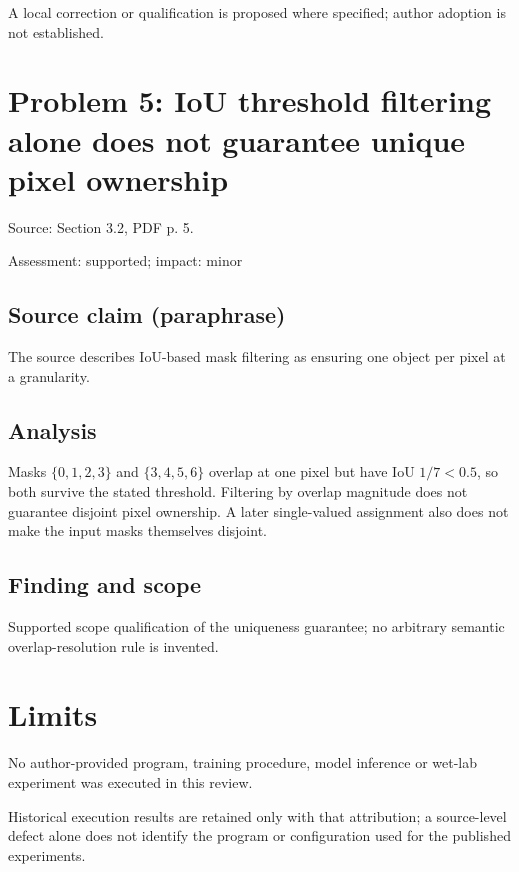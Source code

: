 \documentclass[11pt]{article}
\begin{document}
A local correction or qualification is proposed where specified; author adoption is not established.

\section*{Problem 5: IoU threshold filtering alone does not guarantee unique pixel ownership}

Source: Section 3.2, PDF p. 5.

Assessment: supported; impact: minor

\subsection*{Source claim (paraphrase)}

The source describes IoU-based mask filtering as ensuring one object per pixel at a granularity.

\subsection*{Analysis}

Masks \(\{0,1,2,3\}\) and \(\{3,4,5,6\}\) overlap at one pixel but have IoU \(1/7<0.5\), so both survive the stated threshold. Filtering by overlap magnitude does not guarantee disjoint pixel ownership. A later single-valued assignment also does not make the input masks themselves disjoint.

\subsection*{Finding and scope}

Supported scope qualification of the uniqueness guarantee; no arbitrary semantic overlap-resolution rule is invented.

\section*{Limits}

No author-provided program, training procedure, model inference or wet-lab experiment was executed in this review.\par

Historical execution results are retained only with that attribution; a source-level defect alone does not identify the program or configuration used for the published experiments.\par
\end{document}
